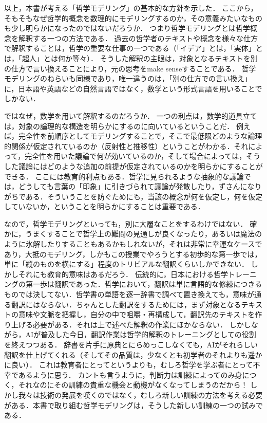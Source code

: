 \documentclass[11pt,a4paper]{jsarticle}
\begin{document}
以上，本書が考える「哲学モデリング」の基本的な方針を示した．
ここから，そもそもなぜ哲学的概念を数理的にモデリングするのか，その意義みたいなものも少し明らかになったのではないだろうか．
つまり哲学モデリングとは哲学概念を解釈する一つの方法である．
過去の哲学者のテキストや概念を様々な仕方で解釈することは，哲学の重要な仕事の一つである（「イデア」とは，「実体」とは，「超人」とは何か等々）．
そうした解釈の主眼は，対象となるテキストを別の仕方で言い換えることにより，元の思考をmake senseすることである．
哲学モデリングのねらいも同様であり，唯一違うのは，「別の仕方での言い換え」に，日本語や英語などの自然言語ではなく，数学という形式言語を用いることでしかない．

ではなぜ，数学を用いて解釈するのだろうか．
一つの利点は，数学的道具立ては，対象の論理的な構造を明らかにするのに向いているということだ．
例えば，完全性を前順序としてモデリングすることで，そこで最低限どのような論理的関係が仮定されているのか（反射性と推移性）ということがわかる．それによって，完全性を用いた議論で何が効いているのか，そして場合によっては，そうした議論にはどのような追加の前提が仮定されているのかを明らかにすることができる．
ここには教育的利点もある．哲学に見られるような抽象的な議論では，どうしても言葉の「印象」に引きづられて議論が発散したり，ずさんになりがちである．そういうことを防ぐためにも，当該の概念が何を仮定し，何を仮定していないか，ということを明らかにすることは重要である．

なので，哲学モデリングといっても，別に大層なことをするわけではない．
確かに，うまくすることで哲学上の難問の見通しが良くなったり，あるいは魔法のように氷解したりすることもあるかもしれないが，それは非常に幸運なケースであり，大抵のモデリング，しかもこの授業でやろうとする初歩的な第一歩では，単に「縦のものを横にする」程度のトリビアルな翻訳くらいしかできない．
しかしそれにも教育的意味はあるだろう．
伝統的に，日本における哲学トレーニングの第一歩は翻訳であった．哲学において，翻訳は単に言語的な修練につきるものでは決してない．哲学書の単語を逐一辞書で調べて置き換えても，意味が通る翻訳にはならない．ちゃんとした翻訳をするためには，まず対象となるテキストの意味や文脈を把握し，自分の中で咀嚼・再構成して，翻訳先のテキストを作り上げる必要がある．それは上で述べた解釈の作業にほかならない．
しかしながら，AIが普及した今日，翻訳作業は哲学的解釈のトレーニングとしての役割を終えつつある．
辞書を片手に原典とにらめっこしなくても，AIがそれらしい翻訳を仕上げてくれる（そしてその品質は，少なくとも初学者のそれよりも遥かに良い）．
これは教育者にとってというよりも，むしろ哲学を学ぶ者にとって不幸であるように思う．
カントも言うように，判断力は訓練によってのみ身につく，それなのにその訓練の貴重な機会と動機がなくなってしまうのだから！
しかし我々は技術の発展を嘆くのではなく，むしろ新しい訓練の方法を考える必要がある．本書で取り組む哲学モデリングは，そうした新しい訓練の一つの試みである．
\end{document}
